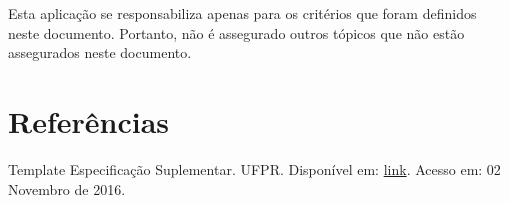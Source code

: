 \begin{apendicesenv}
Esta aplicação se responsabiliza apenas para os critérios que foram definidos neste documento. Portanto, não é assegurado outros tópicos que não estão assegurados neste documento. \\

{\large {\section { Referências \\ } } }

Template Especificação Suplementar. UFPR. Disponível em: \href{http://www.funpar.ufpr.br:8080/rup/webtmpl/templates/req/rup_sspec.htm}{link}. Acesso em: 02 Novembro de 2016.\\

\end{apendicesenv}
